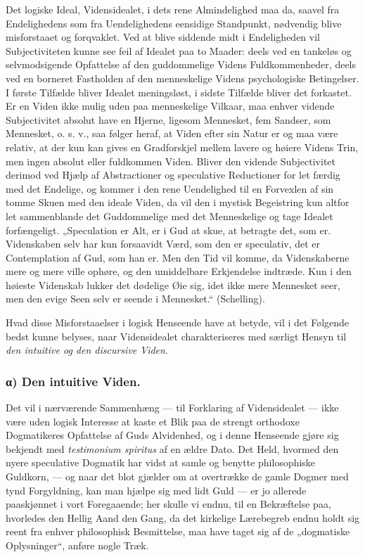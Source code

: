\documentclass[11pt]{book}
\newcommand{\opage}[1]{\marginnote{\footnotesize\textit{[#1]}}}
\begin{document}
Det logiske Ideal, Vidensidealet, i dets rene Almindelighed maa da,
saavel fra Endelighedens som fra Uendelighedens eensidige Standpunkt,
nødvendig blive misforstaaet og forqvaklet. Ved at blive siddende midt i
Endeligheden vil Subjectiviteten kunne see feil af Idealet paa to
Maader: deels ved en tankeløs og selvmodsigende Opfattelse af den
guddommelige Videns Fuldkommenheder, deels ved en borneret Fastholden af
den menneskelige Videns psychologiske Betingelser. I første Tilfælde
bliver Idealet meningsløst, i sidste Tilfælde bliver det forkastet. Er
en Viden ikke mulig uden paa menneskelige Vilkaar, maa enhver vidende
Subjectivitet absolut have en Hjerne, ligesom Mennesket, fem Sandser,
som Mennesket, o. s. v., saa følger heraf, at Viden efter sin Natur er
og maa være relativ, at der kun kan gives en Gradforskjel mellem lavere
og høiere Videns Trin, men ingen absolut eller fuldkommen Viden. Bliver
den vidende Subjectivitet derimod ved Hjælp af Abstractioner og
speculative Reductioner for let færdig med det Endelige, og kommer i den
rene Uendelighed til en Forvexlen af sin tomme Skuen med den ideale
Viden, da vil den i mystisk Begeistring kun altfor let sammenblande det
Guddommelige med det Menneskelige og tage Idealet forfængeligt.
„Speculation er Alt, er i Gud at skue, at betragte det, som er.
Videnskaben selv har kun forsaavidt Værd, som den er speculativ, det er
Contemplation af Gud, som han er. Men den Tid vil komme,
\opage{234} \setcounter{footnote}{0}%
da Videnskaberne mere og mere ville ophøre, og den umiddelbare
Erkjendelse indtræde. Kun i den høieste Videnskab lukker det dødelige
Øie sig, idet ikke mere Mennesket seer, men den evige Seen selv er
seende i Mennesket.“ (Schelling).

Hvad disse Misforstaaelser i logisk Henseende have at betyde, vil i det
Følgende bedst kunne belyses, naar Vidensidealet charakteriseres med
særligt Hensyn til \emph{den intuitive og den discursive Viden}.

\subsubsection*{α) Den intuitive Viden.}

Det vil i nærværende Sammenhæng --- til Forklaring af Vidensidealet ---
ikke være uden logisk Interesse at kaste et Blik paa de strengt
orthodoxe Dogmatikeres Opfattelse af Guds Alvidenhed, og i denne
Henseende gjøre sig bekjendt med \textit{testimonium spiritus} af en
ældre Dato. Det Held, hvormed den nyere speculative Dogmatik har vidst
at samle og benytte philosophiske Guldkorn, --- og naar det blot gjælder
om at overtrække de gamle Dogmer med tynd Forgyldning, kan man hjælpe
sig med lidt Guld --- er jo allerede paaskjønnet i vort Foregaaende; her
skulle vi endnu, til en Bekræftelse paa, hvorledes den Hellig Aand den
Gang, da det kirkelige Lærebegreb endnu holdt sig reent fra enhver
philosophisk Besmittelse, maa have taget sig af de „dogmatiske
Oplysninger“, anføre nogle Træk.
\end{document}
